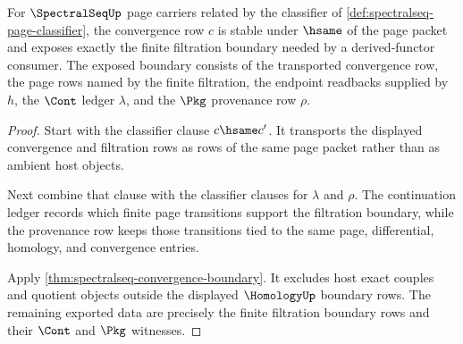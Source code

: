 \begin{theorem}
\label{thm:spectralseq-convergence-filtration-bridge}
For $\SpectralSeqUp$ page carriers related by the classifier of
\autoref{def:spectralseq-page-classifier}, the convergence row $c$ is stable
under $\hsame$ of the page packet and exposes exactly the finite filtration
boundary needed by a derived-functor consumer. The exposed boundary consists of
the transported convergence row, the page rows named by the finite filtration,
the endpoint readbacks supplied by $h$, the $\Cont$ ledger $\lambda$, and the
$\Pkg$ provenance row $\rho$.
\end{theorem}
\begin{proof}
Start with the classifier clause $c\hsame c'$. It transports the displayed
convergence and filtration rows as rows of the same page packet rather than as
ambient host objects.

Next combine that clause with the classifier clauses for $\lambda$ and $\rho$.
The continuation ledger records which finite page transitions support the
filtration boundary, while the provenance row keeps those transitions tied to
the same page, differential, homology, and convergence entries.

Apply \autoref{thm:spectralseq-convergence-boundary}. It excludes host exact
couples and quotient objects outside the displayed $\HomologyUp$ boundary
rows. The remaining exported data are precisely the finite filtration boundary
rows and their $\Cont$ and $\Pkg$ witnesses.
\end{proof}

